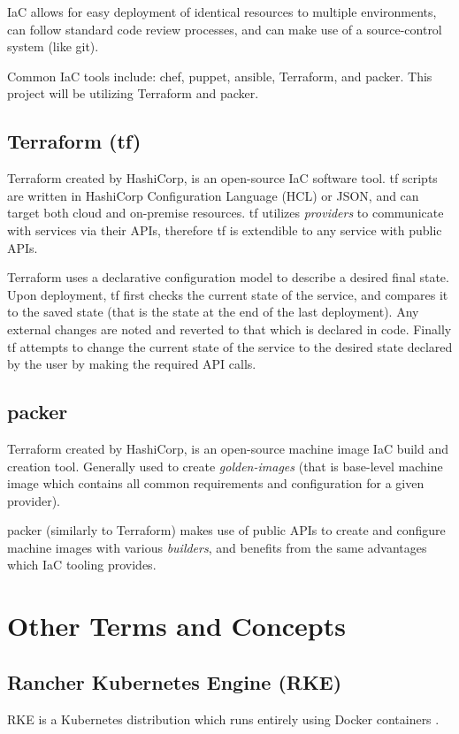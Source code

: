 IaC allows for easy deployment of identical resources to multiple environments, 
can follow standard code review processes, and can make use of a source-control system (like git).

Common IaC tools include: chef\cite{chef}, puppet\cite{puppet}, ansible\cite{ansible}, Terraform\cite{terraform}, and packer\cite{packer}. 
This project will be utilizing Terraform and packer.
 
\section{Terraform (tf)}
Terraform created by HashiCorp\cite{hashicorp}, is an open-source IaC software tool. 
tf scripts are written in HashiCorp Configuration Language (HCL) or JSON, and can target both cloud and on-premise resources.
tf utilizes \textit{providers} to communicate with services via their APIs, therefore tf is extendible to any service with public APIs. 

Terraform uses a declarative configuration model to describe a desired final state. Upon deployment, tf first checks the current state of the service,
and compares it to the saved state (that is the state at the end of the last deployment). Any external changes are noted and reverted to that which is declared in code.
Finally tf attempts to change the current state of the service to the desired state declared by the user by making the required API calls.

\section{packer}
Terraform created by HashiCorp\cite{hashicorp}, is an open-source machine image IaC build and creation tool. 
Generally used to create \emph{golden-images} \cite{HashiCorp_packer_docs} (that is base-level machine image which contains all common requirements and configuration for a given provider).

packer (similarly to Terraform) makes use of public APIs to create and configure machine images with various \textit{builders}, and benefits from the same advantages which IaC tooling provides.


\chapter{Other Terms and Concepts}
\section*{Rancher Kubernetes Engine (RKE)}
RKE is a Kubernetes distribution which runs entirely using Docker containers \cite{rke}. 

